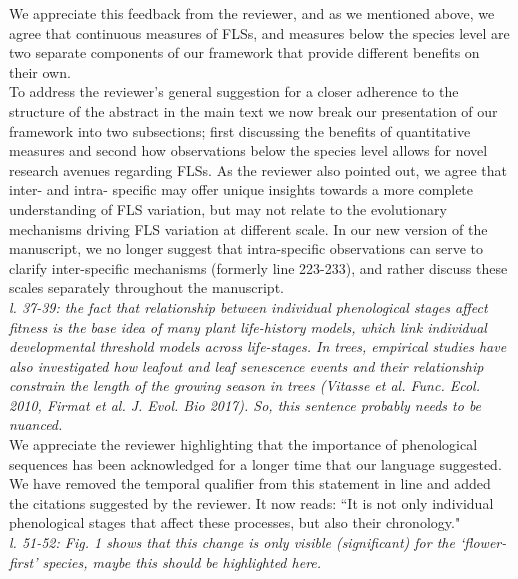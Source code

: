 \documentclass{article}[11pt]
\begin{document}
\noident We appreciate this feedback from the reviewer, and as we mentioned above, we agree that continuous measures of FLSs, and measures below the species level are two separate components of our framework that provide different benefits on their own. \\

To address the reviewer's general suggestion for a closer adherence to the structure of the abstract in the main text we now break our presentation of our framework into two subsections; first discussing the benefits of quantitative measures and second how observations below the species level allows for novel research avenues regarding FLSs. As the reviewer also pointed out, we agree that inter- and intra- specific may offer unique insights towards a more complete understanding of FLS variation, but may not relate to the evolutionary mechanisms driving FLS variation at different scale. In our new version of the manuscript, we no longer suggest that intra-specific observations can serve to clarify inter-specific mechanisms (formerly line 223-233), and rather discuss these scales separately throughout the manuscript.\\



\emph{l. 37-39: the fact that relationship between individual phenological stages affect fitness is the base idea of many plant life-history models, which link individual developmental threshold models across life-stages. In trees, empirical studies have also investigated how leafout and leaf senescence events and their relationship constrain the length of the growing season in trees (Vitasse et al. Func. Ecol. 2010, Firmat et al. J. Evol. Bio 2017). So, this sentence probably needs to be nuanced.}\\

\noindent We appreciate the reviewer highlighting that the importance of phenological sequences has been acknowledged for a longer time that our language suggested. We have removed the temporal qualifier from this statement in line  and added the citations suggested by the reviewer. It now reads: ``It is not only individual phenological stages that affect these processes, but also their chronology."\\

\emph{l. 51-52: Fig. 1 shows that this change is only visible (significant) for the `flower-first' species, maybe this should be highlighted here.}\\
\end{document}
